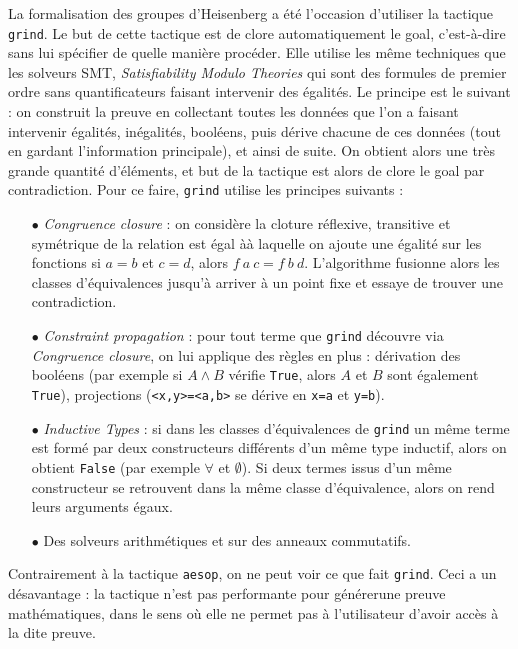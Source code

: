 \documentclass[10pt]{article}
\theoremstyle{definition}
\begin{document}
La formalisation des groupes d'Heisenberg a été l'occasion d'utiliser la tactique \lstinline|grind|. Le but de cette tactique est de clore automatiquement le goal, c'est-à-dire sans lui spécifier de quelle manière procéder. Elle utilise les même techniques que les solveurs SMT, \textit{Satisfiability Modulo Theories} qui sont des formules de premier ordre sans quantificateurs faisant intervenir des égalités. Le principe est le suivant : on construit la preuve en collectant toutes les données que l'on a faisant intervenir égalités, inégalités, booléens, puis dérive chacune de ces données (tout en gardant l'information principale), et ainsi de suite. On obtient alors une très grande quantité d'éléments, et but de la tactique est alors de clore le goal par contradiction.
\newline
Pour ce faire, \lstinline|grind| utilise les principes suivants :
\begin{itemize}
	\item [$\bullet$] \textit{Congruence closure} : on considère la cloture réflexive, transitive et symétrique de la relation \og est égal à\fg à laquelle on ajoute une égalité sur les fonctions \og si $a=b$ et $c=d$, alors $f\ a\ c= f\ b\ d$\fg. L'algorithme fusionne alors les classes d'équivalences jusqu'à arriver à un point fixe et essaye de trouver une contradiction. 
	\item [$\bullet$] \textit{Constraint propagation} : pour tout terme que \lstinline|grind| découvre via \textit{Congruence closure}, on lui applique des règles en plus : dérivation des booléens (par exemple si $A\wedge B$ vérifie \lstinline|True|, alors $A$ et $B$ sont également \lstinline|True|), projections (\lstinline|<x,y>=<a,b>| se dérive en \lstinline|x=a| et \lstinline|y=b|).
	\item[$\bullet$] \textit{Inductive Types} :  si dans les classes d'équivalences de \lstinline|grind| un même terme est formé par deux constructeurs différents d'un même type inductif, alors on obtient \lstinline|False| (par exemple $\forall$ et $\emptyset$). Si deux termes issus d'un même constructeur se retrouvent dans la même classe d'équivalence, alors on rend leurs arguments égaux.
	\item[$\bullet$] Des solveurs arithmétiques et sur des anneaux commutatifs.
\end{itemize}
Contrairement à la tactique \lstinline|aesop|, on ne peut voir ce que fait \lstinline|grind|. Ceci a un désavantage : la tactique n'est pas performante pour \og générer\fg une preuve mathématiques, dans le sens où elle ne permet pas à l'utilisateur d'avoir accès à la dite preuve.
\end{document}
